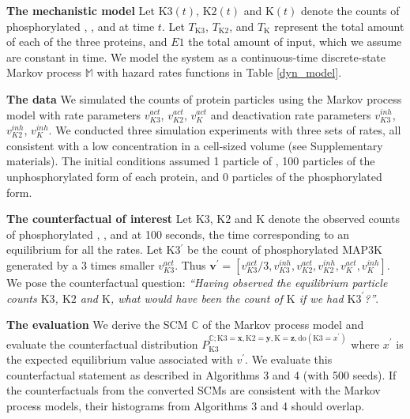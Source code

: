\documentclass{article}
\begin{document}
{\bf The mechanistic model} Let $\text{K3}(t)$, $\text{K2}(t)$ and $\text{K}(t)$ denote the counts of phosphorylated , , and  at time $t$. Let $T_{\text{K3}}$, $T_{\text{K2}}$, and $T_{\text{K}}$ represent the total amount of each of the three proteins, and $E1$ the total amount of input, which we assume are constant in time. We model the system as a continuous-time discrete-state Markov process $\mathbb{M}$ with hazard rates functions in Table \ref{dyn_model}. 

{\bf The data} We simulated the counts of protein particles using the Markov process model with rate parameters $v^{act}_{K3}$, $v^{act}_{K2}$, $v^{act}_{K}$ and deactivation rate parameters $v^{inh}_{K3}$, $v^{inh}_{K2}$, $v^{inh}_{K}$. We conducted three simulation experiments with three sets of rates, all consistent with a low concentration in a cell-sized volume (see Supplementary materials). The initial conditions assumed 1 particle of , 100 particles of the unphosphorylated form of each protein, and 0 particles of the phosphorylated form.

{\bf The counterfactual of interest} Let $\text{K3}$, $\text{K2}$ and $\text{K}$ denote the observed counts of phosphorylated , , and  at 100 seconds, the time corresponding to an equilibrium for all the rates.  Let K3$^{\prime}$ be the count of phosphorylated MAP3K generated by a 3 times smaller $v^{act}_{K3}$. Thus $\mathbf{v}^{\prime} = [v^{act}_{K3}/3, v^{inh}_{K3},v^{act}_{K2}, v^{inh}_{K2}, v^{act}_{K}, v^{inh}_{K}]$.   We pose the counterfactual question: \emph{``Having observed the equilibrium particle counts $\text{K3}$, $\text{K2}$ and $\text{K}$, what would have been the count of $\text{K}$ if we had $\text{K3}^{\prime}$?''}. 

{\bf The evaluation} We derive the SCM $\mathbb{C}$ of the Markov process model and evaluate the counterfactual distribution $P_{\text{K3}}^{\mathbb{C}; \text{K3}=\mathbf{x}, \text{K2}=\mathbf{y}, \text{K}=\mathbf{z}, \text{do}(\text{K3} = x^{\prime})}$ where $x^{\prime}$ is the expected equilibrium value associated with $v^{\prime}$. We evaluate this counterfactual statement as described in Algorithms 3 and 4 (with 500 seeds). If the counterfactuals from the converted SCMs are consistent with the Markov process models, their histograms from Algorithms 3 and 4 should overlap.
\end{document}
